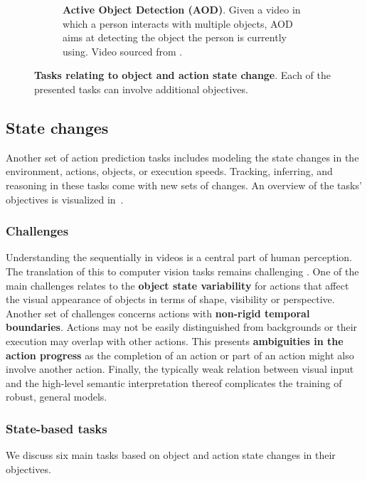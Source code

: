 \begin{figure}[t]
\begin{subfigure}{\linewidth}
\caption{\textbf{Active Object Detection (AOD)}. Given a video in which a person interacts with multiple objects, AOD aims at detecting the object the person is currently using. Video sourced from \citep{ragusa2021meccano}.}
\label{fig:states::aod}
\end{subfigure}
\caption{\textbf{Tasks relating to object and action state change}. Each of the presented tasks can involve additional objectives.}
\label{fig:state_changes}
\end{figure}



\subsection{State changes}
\label{sec:prediction::states}

Another set of action prediction tasks includes modeling the state changes in the environment, actions, objects, or execution speeds. Tracking, inferring, and reasoning in these tasks come with new sets of changes. An overview of the tasks' objectives is visualized in~.

\subsubsection{Challenges}

Understanding the sequentially in videos is a central part of human perception. The translation of this to computer vision tasks remains challenging \citep{de2023there}. One of the main challenges relates to the \textbf{object state variability} for actions that affect the visual appearance of objects in terms of shape, visibility or perspective. Another set of challenges concerns actions with \textbf{non-rigid temporal boundaries}. Actions may not be easily distinguished from backgrounds or their execution may overlap with other actions. This presents \textbf{ambiguities in the action progress} as the completion of an action or part of an action might also involve another action. Finally, the typically weak relation between visual input and the high-level semantic interpretation thereof complicates the training of robust, general models.



\subsubsection{State-based tasks}

We discuss six main tasks based on object and action state changes in their objectives.

